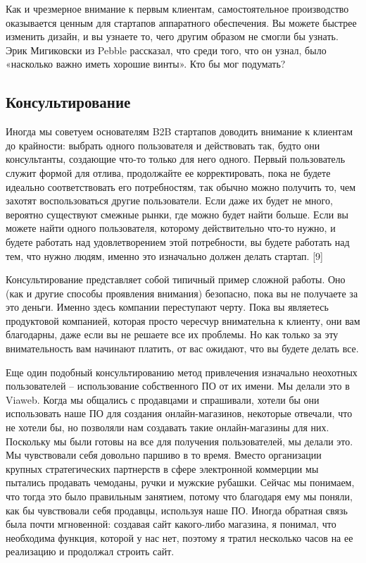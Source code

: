 \documentclass[ebook,12pt,oneside,openany]{memoir}
\begin{document}
Как и чрезмерное внимание к первым клиентам, самостоятельное
производство оказывается ценным для стартапов аппаратного обеспечения.
Вы можете быстрее изменить дизайн, и вы узнаете то, чего другим
образом не смогли бы узнать. Эрик Мигиковски из Pebble рассказал, что
среди того, что он узнал, было «насколько важно иметь хорошие винты».
Кто бы мог подумать? \newline

\subsection{Консультирование}

Иногда мы советуем основателям B2B стартапов доводить внимание к
клиентам до крайности: выбрать одного пользователя и действовать так,
будто они консультанты, создающие что-то только для него одного.
Первый пользователь служит формой для отлива, продолжайте ее
корректировать, пока не будете идеально соответствовать его
потребностям, так обычно можно получить то, чем захотят
воспользоваться другие пользователи. Если даже их будет не много,
вероятно существуют смежные рынки, где можно будет найти больше. Если
вы можете найти одного пользователя, которому действительно что-то
нужно, и будете работать над удовлетворением этой потребности, вы
будете работать над тем, что нужно людям, именно это изначально должен
делать стартап. [9] \newline

Консультирование представляет собой типичный пример сложной работы.
Оно (как и другие способы проявления внимания) безопасно, пока вы не
получаете за это деньги. Именно здесь компании переступают черту. Пока
вы являетесь продуктовой компанией, которая просто чересчур
внимательна к клиенту, они вам благодарны, даже если вы не решаете все
их проблемы. Но как только за эту внимательность вам начинают платить,
от вас ожидают, что вы будете делать все. \newline

Еще один подобный консультированию метод привлечения изначально
неохотных пользователей – использование собственного ПО от их имени.
Мы делали это в Viaweb. Когда мы общались с продавцами и спрашивали,
хотели бы они использовать наше ПО для создания онлайн-магазинов,
некоторые отвечали, что не хотели бы, но позволяли нам создавать такие
онлайн-магазины для них. Поскольку мы были готовы на все для получения
пользователей, мы делали это. Мы чувствовали себя довольно паршиво в
то время. Вместо организации крупных стратегических партнерств в сфере
электронной коммерции мы пытались продавать чемоданы, ручки и мужские
рубашки. Сейчас мы понимаем, что тогда это было правильным занятием,
потому что благодаря ему мы поняли, как бы чувствовали себя продавцы,
используя наше ПО. Иногда обратная связь была почти мгновенной:
создавая сайт какого-либо магазина, я понимал, что необходима функция,
которой у нас нет, поэтому я тратил несколько часов на ее реализацию и
продолжал строить сайт. \newline
\end{document}
